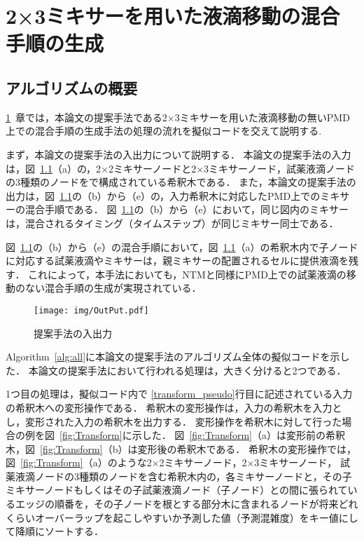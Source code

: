 \chapter{{2×3ミキサーを用いた液滴移動の混合手順の生成}}
\label{proposed}
\section{アルゴリズムの概要}
\ref{proposed}~章では，本論文の提案手法である2$\times$3ミキサーを用いた液滴移動の無いPMD上での混合手順の生成手法の処理の流れを擬似コードを交えて説明する.


まず，本論文の提案手法の入出力について説明する．
本論文の提案手法の入力は，図~\ref{fig:inputoutput}（a）の，2$\times$2ミキサーノードと2$\times$3ミキサーノード，試薬液滴ノードの3種類のノードをで構成されている希釈木である．
また，本論文の提案手法の出力は，図~\ref{fig:inputoutput}の（b）から（e）の，入力希釈木に対応したPMD上でのミキサーの混合手順である．
図~\ref{fig:inputoutput}の（b）から（e）において，同じ図内のミキサーは，混合されるタイミング（タイムステップ）が同じミキサー同士である．

図~\ref{fig:inputoutput}の（b）から（e）の混合手順において，図~\ref{fig:inputoutput}（a）の希釈木内で子ノードに対応する試薬液滴やミキサーは，親ミキサーの配置されるセルに提供液滴を残す．
これによって，本手法においても，NTMと同様にPMD上での試薬液滴の移動のない混合手順の生成が実現されている．

\begin{figure}[tbp]
 \centering\texttt{[image: img/OutPut.pdf]}
 \caption{提案手法の入出力}\label{fig:inputoutput}
\end{figure}

Algorithm~\ref{alg:all}に本論文の提案手法のアルゴリズム全体の擬似コードを示した．
本論文の提案手法において行われる処理は，大きく分けると2つである．

1つ目の処理は，擬似コード内で
\ref{transform_pseudo}行目に記述されている入力の希釈木への変形操作である．
希釈木の変形操作は，入力の希釈木を入力とし，変形された入力の希釈木を出力する．
変形操作を希釈木に対して行った場合の例を図~\ref{fig:Transform}に示した．
図~\ref{fig:Transform}（a）は変形前の希釈木，図~\ref{fig:Transform}（b）は変形後の希釈木である．
希釈木の変形操作では，図~\ref{fig:Transform}（a）のような2$\times$2ミキサーノード，2$\times$3ミキサーノード，
試薬液滴ノードの3種類のノードを含む希釈木内の，各ミキサーノードと，その子ミキサーノードもしくはその子試薬液滴ノード（子ノード）との間に張られているエッジの順番を，その子ノードを根とする部分木に含まれるノードが将来どれくらいオーバーラップを起こしやすいか予測した値（予測混雑度）をキー値にして降順にソートする． 

